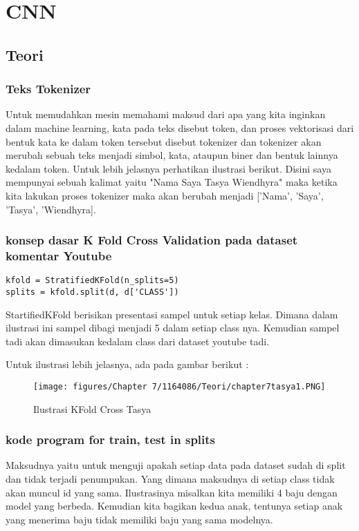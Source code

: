 \chapter{CNN}
\section{Teori}
\subsection{Teks Tokenizer}
Untuk memudahkan mesin memahami maksud dari apa yang kita inginkan dalam machine learning, kata pada teks disebut token, dan proses vektorisasi dari bentuk kata ke dalam token tersebut disebut tokenizer dan tokenizer akan merubah sebuah teks menjadi simbol, kata, ataupun biner dan bentuk lainnya kedalam token. Untuk lebih jelasnya perhatikan ilustrasi berikut. Disini saya mempunyai sebuah kalimat yaitu "Nama Saya Tasya Wiendhyra" maka ketika kita lakukan proses tokenizer maka akan berubah menjadi ['Nama', 'Saya', 'Tasya', 'Wiendhyra].

\subsection{konsep dasar K Fold Cross Validation pada dataset komentar Youtube} 
\begin{lstlisting}[caption=K Fold Cross Validation,label={lst:7.0}]
kfold = StratifiedKFold(n_splits=5)
splits = kfold.split(d, d['CLASS'])
\end{lstlisting}

StartifiedKFold berisikan presentasi sampel untuk setiap kelas. Dimana dalam ilustrasi ini sampel dibagi menjadi 5 dalam setiap class nya. Kemudian sampel tadi akan dimasukan kedalam class dari dataset youtube tadi.

Untuk ilustrasi lebih jelasnya, ada pada gambar berikut :
\begin{figure}[ht]
\centering
\texttt{[image: figures/Chapter 7/1164086/Teori/chapter7tasya1.PNG]}
\caption{Ilustrasi KFold Cross Tasya}
\label{Teori}
\end{figure}

\subsection{kode program for train, test in splits} 
Maksudnya yaitu untuk menguji apakah setiap data pada dataset sudah di split dan tidak terjadi penumpukan. Yang dimana maksudnya di setiap class tidak akan muncul id yang sama. Ilustrasinya misalkan kita memiliki 4 baju dengan model yang berbeda. Kemudian kita bagikan kedua anak, tentunya setiap anak yang menerima baju tidak memiliki baju yang sama modelnya.

